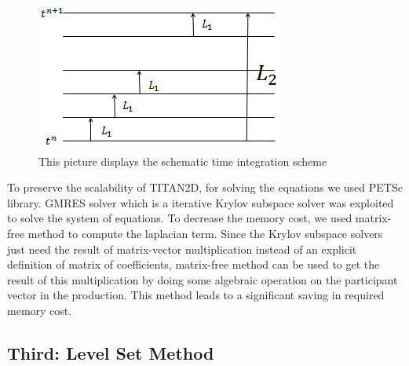 \documentclass[letterpaper,10pt]{article}
\begin{document}
\begin{figure}[!h]

\begin{center} 
\includegraphics[width=2.5truein]{IMAGES/integrator.png}
\caption{This picture displays the schematic time integration scheme }
\label{figintegrator}
\end{center}

\end{figure}
To preserve the scalability of TITAN2D, for solving the equations we used PETSc \cite{petsc-user-ref} library. GMRES solver which is a iterative Krylov subspace solver 
was exploited to solve the system of equations. To decrease the memory cost, we used matrix-free method to compute the laplacian term.
Since the Krylov subspace solvers just need the result of matrix-vector multiplication instead of an explicit definition of matrix 
of coefficients, matrix-free method can be used to get the result of this multiplication by doing some algebraic operation on 
the participant vector in the production. This method leads to a significant saving in required memory cost.

\subsection{Third: Level Set Method} \label{level set}
\end{document}
